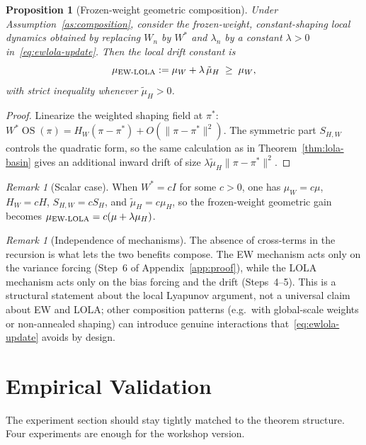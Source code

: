 \documentclass{article}
\theoremstyle{plain}
\newtheorem{proposition}[theorem]{Proposition}
\theoremstyle{definition}
\theoremstyle{remark}
\newtheorem{remark}[theorem]{Remark}
\DeclareMathOperator{\OS}{OS}
\begin{document}
\begin{proposition}[Frozen-weight geometric composition]\label{prop:ewlola-geometry}
Under Assumption~\ref{as:composition}, consider the \emph{frozen-weight, constant-shaping} local dynamics obtained by replacing $W_n$ by $W^\ast$ and $\lambda_n$ by a constant $\lambda>0$ in~\eqref{eq:ewlola-update}. Then the local drift constant is
\begin{equation}\label{eq:mueff}
\mu_{\mathrm{EW\textup{-}LOLA}} := \mu_W + \lambda\,\tilde\mu_H \;\ge\; \mu_W,
\end{equation}
with strict inequality whenever $\tilde\mu_H>0$.
\end{proposition}

\begin{proof}
Linearize the weighted shaping field at $\pi^\ast$: $W^\ast\OS(\pi)=H_W(\pi-\pi^\ast)+O(\|\pi-\pi^\ast\|^2)$. The symmetric part $S_{H,W}$ controls the quadratic form, so the same calculation as in Theorem~\ref{thm:lola-basin} gives an additional inward drift of size $\lambda\tilde\mu_H\|\pi-\pi^\ast\|^2$.
\end{proof}

\begin{remark}[Scalar case]
When $W^\ast = cI$ for some $c>0$, one has $\mu_W=c\mu$, $H_W=cH$, $S_{H,W}=cS_H$, and $\tilde\mu_H=c\mu_H$, so the frozen-weight geometric gain becomes $\mu_{\mathrm{EW\textup{-}LOLA}}=c(\mu+\lambda\mu_H)$.
\end{remark}

\begin{remark}[Independence of mechanisms]
The absence of cross-terms in the recursion is what lets the two benefits compose. The EW mechanism acts only on the variance forcing (Step~6 of Appendix~\ref{app:proof}), while the LOLA mechanism acts only on the bias forcing and the drift (Steps~4--5). This is a structural statement about the local Lyapunov argument, not a universal claim about EW and LOLA; other composition patterns (e.g.\ with global-scale weights or non-annealed shaping) can introduce genuine interactions that~\eqref{eq:ewlola-update} avoids by design.
\end{remark}

\section{Empirical Validation}\label{sec:experiments}

The experiment section should stay tightly matched to the theorem structure. Four experiments are enough for the workshop version.
\end{document}
